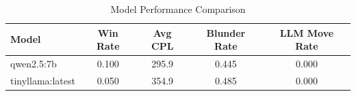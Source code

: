 \begin{table}[h]
\centering
\caption{Model Performance Comparison}
\begin{tabular}{lcccc}
\toprule
Model & Win Rate & Avg CPL & Blunder Rate & LLM Move Rate \\
\midrule
qwen2.5:7b & 0.100 & 295.9 & 0.445 & 0.000 \\
tinyllama:latest & 0.050 & 354.9 & 0.485 & 0.000 \\
\bottomrule
\end{tabular}
\end{table}